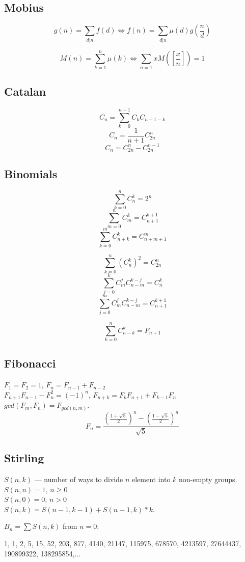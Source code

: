 \subsection{Mobius}
\[g(n) = \sum_{d|n}f(d) \iff f(n) = \sum_{d|n}\mu(d)g(\frac{n}{d})\]

\[M(n) = \sum_{k=1}^{n}\mu(k) \iff \sum_{n = 1}{x} M([\frac{x}{n}]) = 1\]

\subsection{Catalan}
$$C_n = \sum_{k = 0}^{n - 1} C_kC_{n - 1 - k}$$ 
$$C_n = \frac{1}{n + 1} C_{2n}^{n}$$
$$C_n = C_{2n}^{n} - C_{2n}^{n - 1}$$

\subsection{Binomials}
$$\sum_{k = 0}^{n} C_n^k = 2^n$$ 
$$\sum_{m = 0}^{n} C_m^k = C_{n + 1}^{k + 1}$$
$$\sum_{k = 0}^{m} C_{n + k}^k = C_{n + m + 1}^m$$

$$\sum_{k = 0}^{n} (C_n^k)^2 = C_{2n}^n$$
$$\sum_{j = 0}^{k} C_m^j C_{n-m}^{k - j} = C_n^k$$
$$\sum_{j = 0}^{m} C_m^j C_{n-m}^{k - j} = C_{n + 1}^{k + 1}$$

$$\sum_{k = 0}^{n} C_{n - k}^k = F_{n + 1}$$

\subsection{Fibonacci}
$F_1 = F_2 = 1$, $F_n = F_{n - 1} + F_{n - 2}$\\

$F_{n + 1} F_{n - 1} - F_n^2 = (-1)^n$,
$F_{n + k} = F_k F_{n + 1} + F_{k - 1} F_n$\\
$gcd(F_m, F_n) = F_{gcd(n, m)}$.
$$F_n = \frac{(\frac{1 + \sqrt{5}}{2})^n - (\frac{1 - \sqrt{5}}{2})^n}{\sqrt{5}}$$

\subsection{Stirling}

$S(n, k)$ --- number of ways to divide $n$ element into $k$ non-empty groups.\\

$S(n, n) = 1$, $n \ge 0$\\
$S(n, 0) = 0$, $n > 0$\\

$S(n, k) = S(n - 1, k - 1) + S(n - 1, k) * k$.


$B_n = \sum S(n, k)$ from $n = 0$:

1, 1, 2, 5, 15, 52, 203, 877, 4140, 21147, 115975, 678570, 4213597, 27644437, 190899322, 138295854,...






\
